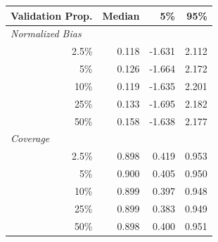 
\begin{tabular}{r|rrr}
\toprule
Validation Prop. & Median & 5\% & 95\%\\
\midrule
\multicolumn{1}{l|}{\textit{Normalized Bias}}\\
2.5\% & 0.118 & -1.631 & 2.112\\
5\% & 0.126 & -1.664 & 2.172\\
10\% & 0.119 & -1.635 & 2.201\\
25\% & 0.133 & -1.695 & 2.182\\
50\% & 0.158 & -1.638 & 2.177\\
\midrule
%
\multicolumn{1}{l|}{\textit{Coverage}}\\
2.5\% & 0.898 & 0.419 & 0.953\\
5\% & 0.900 & 0.405 & 0.950\\
10\% & 0.899 & 0.397 & 0.948\\
25\% & 0.899 & 0.383 & 0.949\\
50\% & 0.898 & 0.400 & 0.951\\
\bottomrule
\end{tabular}
